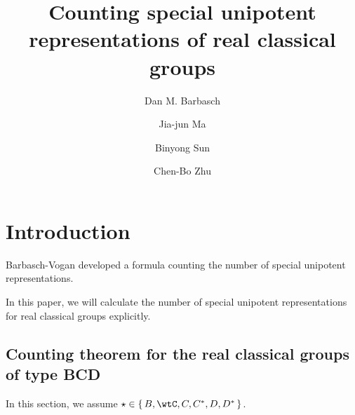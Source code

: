 \documentclass[12pt,a4paper]{amsart}
\numberwithin{equation}{section}
\theoremstyle{remark}
\begin{document}
\title[]{Counting special unipotent representations of real classical groups}

\author [D. Barbasch] {Dan M. Barbasch}
\address{the Department of Mathematics\\
  310 Malott Hall, Cornell University, Ithaca, New York 14853 }

\author [J.-J. Ma] {Jia-jun Ma}
\address{School of Mathematical Sciences\\
  Shanghai Jiao Tong University\\
  800 Dongchuan Road, Shanghai, 200240, China} 

\author [B. Sun] {Binyong Sun}
\address{Academy of Mathematics and Systems Science\\
  Chinese Academy of Sciences\\
  Beijing, 100190, China} 

\author [C.-B. Zhu] {Chen-Bo Zhu}
\address{Department of Mathematics\\
  National University of Singapore\\
  10 Lower Kent Ridge Road, Singapore 119076} 




 

\maketitle


\tableofcontents
\section{Introduction}

%

Barbasch-Vogan \cite{BVUni,BV.W} developed a formula  counting the number of
special unipotent representations.

In this paper, we will calculate the number of special unipotent representations
for real classical groups explicitly.



\subsection{Counting theorem for the real classical groups of type BCD}
In this section, we assume $\star  \in \set{B,\wtC,C,C^{*}, D, D^{*}}$.
\end{document}
